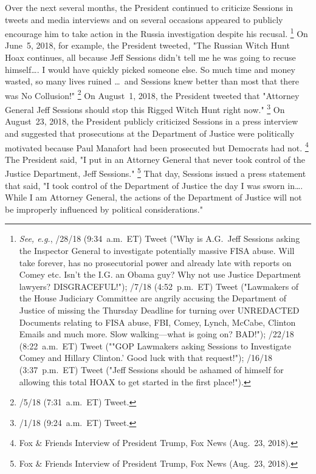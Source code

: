 Over the next several months, the President continued to criticize Sessions in tweets and media interviews and on several occasions appeared to publicly encourage him to take action in the Russia investigation despite his recusal.%
\footnote{\textit{See, e.g.}, /28/18 (9:34~a.m.~ET) Tweet ("Why is A.G.~Jeff Sessions asking the Inspector General to investigate potentially massive FISA abuse.
Will take forever, has no prosecutorial power and already late with reports on Comey etc.
Isn't the I.G. an Obama guy?
Why not use Justice Department lawyers?
DISGRACEFUL!");
/7/18 (4:52~p.m.~ET) Tweet ("Lawmakers of the House Judiciary Committee are angrily accusing the Department of Justice of missing the Thursday Deadline for turning over UNREDACTED Documents relating to FISA abuse, FBI, Comey, Lynch, McCabe, Clinton Emails and much more.
Slow walking---what is going on? BAD!");
/22/18 (8:22~a.m.~ET) Tweet (""GOP Lawmakers asking Sessions to Investigate Comey and Hillary Clinton.' \@FoxNews Good luck with that request!");
/16/18 (3:37~p.m.~ET) Tweet ("Jeff Sessions should be ashamed of himself for allowing this total HOAX to get started in the first place!").}
On June~5, 2018, for example, the President tweeted, "The Russian Witch Hunt Hoax continues, all because Jeff Sessions didn't tell me he was going to recuse himself\dots. I would have quickly picked someone else.
So much time and money wasted, so many lives ruined \dots\ and Sessions knew better than most that there was No Collusion!"%
\footnote{/5/18 (7:31~a.m.~ET) Tweet.}
On August~1, 2018, the President tweeted that "Attorney General Jeff Sessions should stop this Rigged Witch Hunt right now."%
\footnote{/1/18 (9:24~a.m.~ET) Tweet.}
On August~23, 2018, the President publicly criticized Sessions in a press interview and suggested that prosecutions at the Department of Justice were politically motivated because Paul Manafort had been prosecuted but Democrats had not.%
\footnote{Fox \& Friends Interview of President Trump, Fox News (Aug.~23, 2018).}
The President said, "I put in an Attorney General that never took control of the Justice Department, Jeff Sessions."%
\footnote{Fox \& Friends Interview of President Trump, Fox News (Aug.~23, 2018).}
That day, Sessions issued a press statement that said, "I took control of the Department of Justice the day I was sworn in\dots.
While I am Attorney General, the actions of the Department of Justice will not be improperly influenced by political considerations."%
